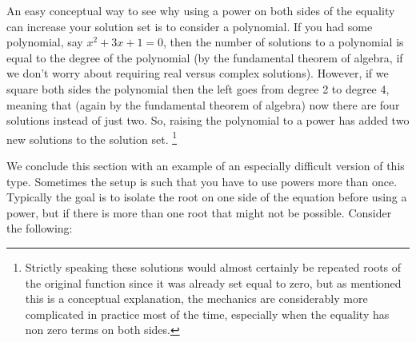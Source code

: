 \documentclass{ximeraXloud}
\begin{document}
    An easy conceptual way to see why using a power on both sides of the equality can increase your solution set is to consider a polynomial. If you had some polynomial, say $x^2 + 3x + 1 = 0$, then the number of solutions to a polynomial is equal to the degree of the polynomial (by the fundamental theorem of algebra, if we don't worry about requiring real versus complex solutions). However, if we square both sides the polynomial then the left goes from degree 2 to degree 4, meaning that (again by the fundamental theorem of algebra) now there are four solutions instead of just two. So, raising the polynomial to a power has added two new solutions to the solution set.%
    \footnote{%
        Strictly speaking these solutions would almost certainly be repeated roots of the original function since it was already set equal to zero, but as mentioned this is a conceptual explanation, the mechanics are considerably more complicated in practice most of the time, especially when the equality has non zero terms on both sides.%
        }


    We conclude this section with an example of an especially difficult version of this type. Sometimes the setup is such that you have to use powers more than once. Typically the goal is to isolate the root on one side of the equation before using a power, but if there is more than one root that might not be possible. Consider the following:
\end{document}
